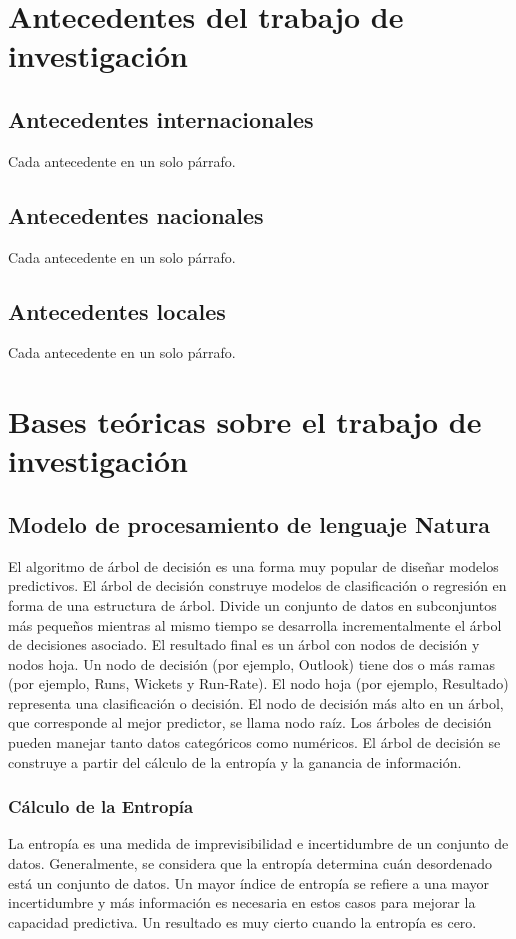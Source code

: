 

\section{Antecedentes del trabajo de investigación}

\subsection{Antecedentes internacionales}
Cada antecedente en un solo párrafo.


\subsection{Antecedentes nacionales}
Cada antecedente en un solo párrafo.

\subsection{Antecedentes locales}
Cada antecedente en un solo párrafo.

\section{Bases teóricas sobre el trabajo de investigación}

\subsection{Modelo de procesamiento de lenguaje Natura}
El algoritmo de árbol de decisión es una forma muy popular de diseñar modelos predictivos. El árbol de decisión construye modelos de clasificación o regresión en forma de una estructura de árbol. Divide un conjunto de datos en subconjuntos más pequeños mientras al mismo tiempo se desarrolla incrementalmente el árbol de decisiones asociado. El resultado final es un árbol con nodos de decisión y nodos hoja. Un nodo de decisión (por ejemplo, Outlook) tiene dos o más ramas (por ejemplo, Runs, Wickets y Run-Rate). El nodo hoja (por ejemplo, Resultado) representa una clasificación o decisión. El nodo de decisión más alto en un árbol, que corresponde al mejor predictor, se llama nodo raíz. Los árboles de decisión pueden manejar tanto datos categóricos como numéricos. El árbol de decisión se construye a partir del cálculo de la entropía y la ganancia de información.


\subsubsection{Cálculo de la Entropía}
La entropía es una medida de imprevisibilidad e incertidumbre de un conjunto de datos. Generalmente, se considera que la entropía determina cuán desordenado está un conjunto de datos. Un mayor índice de entropía se refiere a una mayor incertidumbre y más información es necesaria en estos casos para mejorar la capacidad predictiva. Un resultado es muy cierto cuando la entropía es cero.

